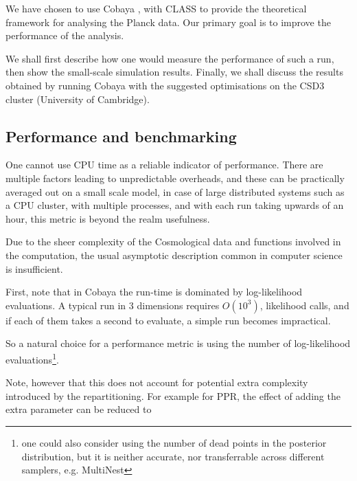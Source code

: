 \documentclass[usenatbib]{mnras}
\begin{document}
We have chosen to use Cobaya \citep{cobaya}, with CLASS to provide the
theoretical framework for analysing the Planck \citep{planck}
data. Our primary goal is to improve the performance of the
analysis.

We shall first describe how one would measure the performance of
such a run, then show the small-scale simulation results. Finally,
we shall discuss the results obtained by running Cobaya with the
suggested optimisations on the CSD3 cluster (University of Cambridge).


\subsection{Performance and benchmarking}
\label{sec:org1adc67a}
One cannot use CPU time as a reliable indicator of
performance. There are multiple factors leading to unpredictable
overheads, and these can be practically averaged out on a small
scale model, in case of large distributed systems such as a CPU
cluster, with multiple processes, and with each run taking upwards
of an hour, this metric is beyond the realm usefulness.

Due to the sheer complexity of the Cosmological data and functions
involved in the computation, the usual asymptotic description
common in computer science is insufficient. 

First, note that in Cobaya  the run-time is dominated
by log-likelihood evaluations. A typical run in 3 dimensions
requires \(O(10^{3})\), likelihood calls, and if each of them takes a
second to evaluate, a simple run becomes impractical. 

So a natural choice for a performance metric is using the number of
log-likelihood evaluations\footnote{one could also consider using the number of dead points in the posterior distribution, but it is neither accurate, nor transferrable across different samplers, e.g. MultiNest}. 

Note, however that this does not account for potential extra
complexity introduced by the repartitioning. For example for PPR,
the effect of adding the extra parameter can be reduced to
\end{document}
